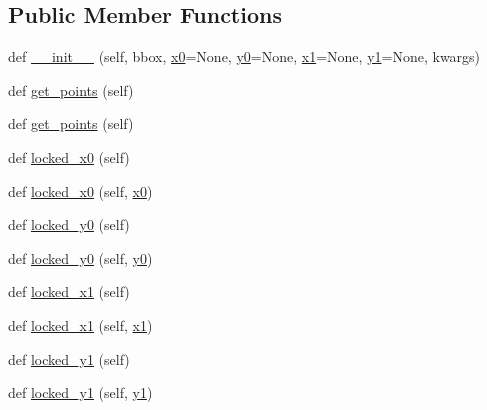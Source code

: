 \subsection*{Public Member Functions}
\begin{DoxyCompactItemize}
\item 
def \hyperlink{classmatplotlib_1_1transforms_1_1LockableBbox_a7cdec0d9af34112fe56631b5cbc0698b}{\+\_\+\+\_\+init\+\_\+\+\_\+} (self, bbox, \hyperlink{classmatplotlib_1_1transforms_1_1BboxBase_a426599036a5f39ef257bab0ae084189f}{x0}=None, \hyperlink{classmatplotlib_1_1transforms_1_1BboxBase_a19dc90c8fe29252596fe6221eb2e272c}{y0}=None, \hyperlink{classmatplotlib_1_1transforms_1_1BboxBase_aedc05db4a446ed350213282d807cc8e5}{x1}=None, \hyperlink{classmatplotlib_1_1transforms_1_1BboxBase_a8e78484c0c5b6d158b3d2b538ae3b2fc}{y1}=None, kwargs)
\item 
def \hyperlink{classmatplotlib_1_1transforms_1_1LockableBbox_a9d09bc9632bf7280af1f9a7b0029cba3}{get\+\_\+points} (self)
\item 
def \hyperlink{classmatplotlib_1_1transforms_1_1LockableBbox_a9d09bc9632bf7280af1f9a7b0029cba3}{get\+\_\+points} (self)
\item 
def \hyperlink{classmatplotlib_1_1transforms_1_1LockableBbox_a20fd4cc71a924a57869839b39c5b935f}{locked\+\_\+x0} (self)
\item 
def \hyperlink{classmatplotlib_1_1transforms_1_1LockableBbox_a0af9c4d97af3bd6fe6918dd37906cf30}{locked\+\_\+x0} (self, \hyperlink{classmatplotlib_1_1transforms_1_1BboxBase_a426599036a5f39ef257bab0ae084189f}{x0})
\item 
def \hyperlink{classmatplotlib_1_1transforms_1_1LockableBbox_af44ae8eca31c8a8c37a5d1f2b4437540}{locked\+\_\+y0} (self)
\item 
def \hyperlink{classmatplotlib_1_1transforms_1_1LockableBbox_a70ba812f04f38948856673d44037e84d}{locked\+\_\+y0} (self, \hyperlink{classmatplotlib_1_1transforms_1_1BboxBase_a19dc90c8fe29252596fe6221eb2e272c}{y0})
\item 
def \hyperlink{classmatplotlib_1_1transforms_1_1LockableBbox_a0adc5f99d13ea45247cb2815c5b7d56d}{locked\+\_\+x1} (self)
\item 
def \hyperlink{classmatplotlib_1_1transforms_1_1LockableBbox_a0e39e71b7ec7adcc77cad7f6d59f8dc7}{locked\+\_\+x1} (self, \hyperlink{classmatplotlib_1_1transforms_1_1BboxBase_aedc05db4a446ed350213282d807cc8e5}{x1})
\item 
def \hyperlink{classmatplotlib_1_1transforms_1_1LockableBbox_a9bae3dcce6572e168bb9adc1d7fdc491}{locked\+\_\+y1} (self)
\item 
def \hyperlink{classmatplotlib_1_1transforms_1_1LockableBbox_ae044e8fb29e00c3d1b4b959aa57f5a70}{locked\+\_\+y1} (self, \hyperlink{classmatplotlib_1_1transforms_1_1BboxBase_a8e78484c0c5b6d158b3d2b538ae3b2fc}{y1})
\end{DoxyCompactItemize}
